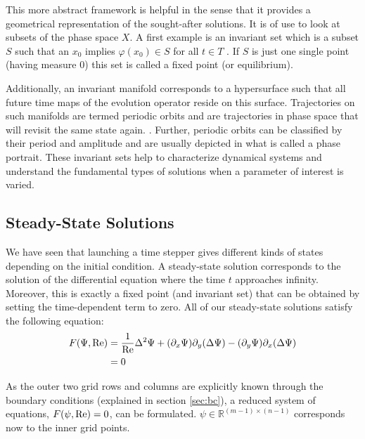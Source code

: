 This more abstract framework is helpful in the sense that it provides a
geometrical representation of the sought-after solutions. It is of use to look
at subsets of the phase space $X$. A first example is an invariant set which is
a subset $S$ such that an $x_0$ implies $\varphi(x_0) \in S$ for all $t \in T$
\citep{kuznetsov2004}. If $S$ is just one single point (having measure $0$)
this set is called a fixed point (or equilibrium). 

Additionally, an invariant manifold corresponds to a hypersurface such that all
future time maps of the evolution operator reside on this surface. Trajectories
on such manifolds are termed periodic orbits and are trajectories in phase
space that will revisit the same state again. . Further, periodic orbits can be classified by their period and
amplitude and are usually depicted in what is called a phase portrait. These
invariant sets help to characterize dynamical systems and understand the
fundamental types of solutions when a parameter of interest is varied.

\subsection{Steady-State Solutions}

We have seen that launching a time stepper gives different kinds of states
depending on the initial condition. A steady-state solution corresponds to the
solution of the differential equation where the time $t$ approaches infinity.
Moreover, this is exactly a fixed point (and invariant set) that can be
obtained by setting the time-dependent term to zero. All of our steady-state
solutions satisfy the following equation:
\begin{align}
  F(\Psi, \mathrm{Re}) & = \frac{1}{\mathrm{Re}}\Delta^2 \Psi +
    (\partial_x \Psi) \partial_y(\Delta \Psi) -
    (\partial_y \Psi) \partial_x(\Delta \Psi) \nonumber \\
  & =  0 \label{eq:str_steady}
\end{align}

As the outer two grid rows and columns are explicitly known through the
boundary conditions (explained in section \ref{sec:bc}), a reduced system of
equations, $F(\psi, \mathrm{Re}) = 0$, can be formulated. $\psi \in
\mathbb{R}^{(m-1)\times(n-1)} $ corresponds now to the inner grid points. 

